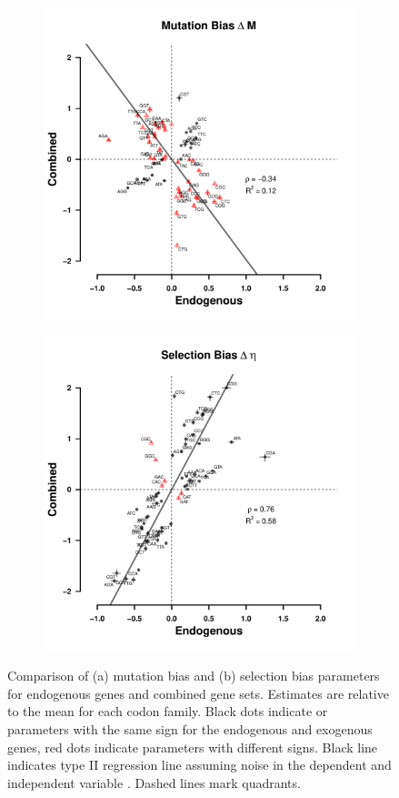 \documentclass[fleqn,letterpaper]{article}
\begin{document}
\begin{figure}
    \centering
    \begin{subfigure}
        \centering
        \includegraphics[width=.45\textwidth]{img/csp_corr_dm_full.pdf}
    \end{subfigure}
    \begin{subfigure}
        \centering
        \includegraphics[width=.45\textwidth]{img/csp_corr_deta_full.pdf}
    \end{subfigure}
    \caption{Comparison of (a) mutation bias \DM and (b) selection bias \DE parameters for endogenous genes and combined gene sets.
      Estimates are relative to the mean for each codon family.
      Black dots indicate \DM or \DE parameters with the same sign for the endogenous and exogenous genes, red dots indicate parameters with different signs.
      Black line indicates type II regression line assuming noise in the dependent and independent variable \citep{SokalAndRohlf1981}.
      Dashed lines mark quadrants.}
    \label{fig:csp_end_comb}
\end{figure}
\null
\vfill
\clearpage
\end{document}
